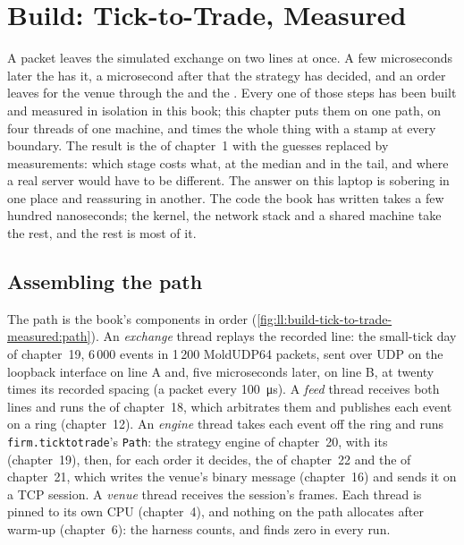 \chapter{Build: Tick-to-Trade, Measured}\label{ch:ll:build-tick-to-trade-measured}

A packet leaves the simulated exchange on two lines at once. A few microseconds later the  has it, a microsecond
after that the strategy has decided, and an order leaves for the venue through the  and the . Every one
of those steps has been built and measured in isolation in this book; this chapter puts them on one path, on four threads of
one machine, and times the whole thing with a stamp at every boundary. The result is the  of chapter~1 with the
guesses replaced by measurements: which stage costs what, at the median and in the tail, and where a real server would have to
be different. The answer on this laptop is sobering in one place and reassuring in another. The code the book has written
takes a few hundred nanoseconds; the kernel, the network stack and a shared machine take the rest, and the rest is most of it.

\section{Assembling the path}

The path is the book's components in order (\cref{fig:ll:build-tick-to-trade-measured:path}). An \emph{exchange} thread replays
the recorded line: the small-tick day of chapter~19, 6\,000 events in 1\,200 MoldUDP64 packets, sent over UDP on the loopback
interface on line A and, five microseconds later, on line B, at twenty times its recorded spacing (a packet every
\qty{100}{\micro\second}). A \emph{feed} thread receives both lines and runs the  of chapter~18, which arbitrates
them and publishes each event on a ring (chapter~12). An \emph{engine} thread takes each event off the ring and runs
\texttt{firm.ticktotrade}'s \texttt{Path}: the strategy engine of chapter~20, with its  (chapter~19), then, for each
order it decides, the  of chapter~22 and the  of chapter~21, which writes the venue's binary message
(chapter~16) and sends it on a TCP session. A \emph{venue} thread receives the session's frames. Each thread is pinned to its
own CPU (chapter~4), and nothing on the path allocates after warm-up (chapter~6): the harness counts, and finds zero in every
run.

